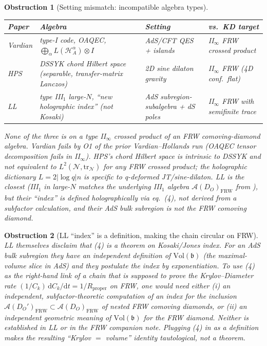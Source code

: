 \documentclass[11pt]{article}
\newtheorem{obstruction}{Obstruction}
\newcommand{\HH}{\mathcal{H}}
\newcommand{\AA}{\mathcal{A}}
\newcommand{\NN}{\mathcal{N}}
\newcommand{\FRW}{\mathrm{FRW}}
\newcommand{\Rprop}{R_{\mathrm{proper}}}
\begin{document}
\begin{obstruction}[Setting mismatch: incompatible algebra types]\label{obs:T2}
\begin{center}
\renewcommand{\arraystretch}{1.2}
\begin{tabular}{p{2.4cm}p{4.4cm}p{4.0cm}p{3.6cm}}
\toprule
Paper & Algebra & Setting & vs.\ KD target \\
\midrule
Vardian   & type-I code, OAQEC, $\bigoplus_\alpha L(\HH_A^\alpha)\otimes I$ & AdS/CFT QES + islands & II$_\infty$ FRW crossed product \\
HPS       & DSSYK chord Hilbert space (separable, transfer-matrix Lanczos) & 2D sine dilaton gravity & II$_\infty$ FRW (4D conf.\ flat) \\
LL        & type III$_1$ large-$N$, ``new holographic index'' (not Kosaki) & AdS subregion-subalgebra + dS poles & II$_\infty$ FRW with semifinite trace \\
\bottomrule
\end{tabular}
\end{center}
None of the three is on a type II$_\infty$ crossed product of an FRW
comoving-diamond algebra. Vardian fails by O1 of the prior
Vardian--Hollands run (OAQEC tensor decomposition fails in II$_\infty$).
HPS's chord Hilbert space is intrinsic to DSSYK and not equivalent to
$L^2(\NN,\mathrm{tr}_\NN)$ for any FRW crossed product; the holographic dictionary
$L = 2|\log q|n$ is specific to q-deformed JT/sine-dilaton. LL is the closest
(III$_1$ in large-$N$ matches the underlying III$_1$ algebra
$\AA(D_O)_\FRW$ from \cite[Thm.~3.5]{Remondiere2026}), but their ``index''
is \emph{defined} holographically via eq.~(4), not derived from a subfactor
calculation, and their AdS bulk subregion is not the FRW comoving diamond.
\end{obstruction}

\begin{obstruction}[LL ``index'' is a definition, making the chain circular on FRW]\label{obs:T3}
LL themselves disclaim that (4) is a theorem on Kosaki/Jones index. For an
AdS bulk subregion they have an \emph{independent} definition of
$\mathrm{Vol}(\mathfrak{b})$ (the maximal-volume slice in AdS) and they
\emph{postulate} the index by exponentiation. To use (4) as the right-hand link
of a chain that is supposed to \emph{prove} the Krylov--Diameter rate
$(1/C_k)\,\mathrm{d}C_k/\mathrm{d}t = 1/\Rprop$ on FRW, one would need either
(i) an independent, subfactor-theoretic computation of an index for the
inclusion $\AA(D_O')_\FRW \subset \AA(D_O)_\FRW$ of nested FRW comoving
diamonds, or (ii) an independent geometric meaning of $\mathrm{Vol}(\mathfrak{b})$
for the FRW diamond. Neither is established in LL or in the FRW companion
note. Plugging (4) in as a \emph{definition} makes the resulting
``Krylov $=$ volume'' identity tautological, not a theorem.
\end{obstruction}
\end{document}

